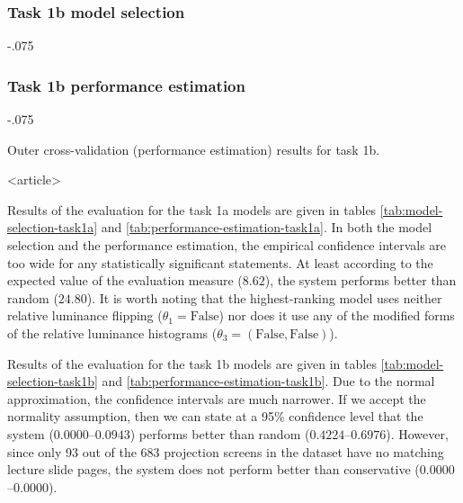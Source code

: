 \begin{frame}[fragile]
\frametitle<presentation>{Task 1b model selection}
\begin{table}
\ifarticle
  \leavevmode\kern-.075\textwidth
\fi

\caption{Inner cross-validation (model selection) results for task 1b.
\ifarticle
  Results for all 11 parametrized task 1b models are shown.%
\fi}
\label{tab:model-selection-task1b}
\end{table}
\end{frame}

\begin{frame}[fragile]
\frametitle<presentation>{Task 1b performance estimation}
\begin{table}
\ifarticle
  \leavevmode\kern-.075\textwidth
\fi

\caption{Outer cross-validation (performance estimation) results for task 1b.}
\label{tab:performance-estimation-task1b}
\end{table}
\end{frame}

\mode
<article>

Results of the evaluation for the task 1a models are given in tables
\ref{tab:model-selection-task1a} and \ref{tab:performance-estimation-task1a}.
In both the model selection and the performance estimation, the empirical
confidence intervals are too wide for any statistically significant statements.
At least according to the expected value of the evaluation measure ($8.62$),
the system performs better than random ($24.80$).
It is worth noting that the highest-ranking model uses neither relative
luminance flipping ($\theta_1=\text{False}$) nor does it use any of the
modified forms of the relative luminance histograms ($\theta_3=(\text{False},
\text{False})$).

Results of the evaluation for the task 1b models are given in tables
\ref{tab:model-selection-task1b} and \ref{tab:performance-estimation-task1b}.
Due to the normal approximation, the confidence intervals are much narrower. If
we accept the normality assumption, then we can state at a 95\% confidence
level that the system ($0.0000$--$0.0943$) performs better than random
($0.4224$--$0.6976$). However, since only 93 out of the 683 projection screens
in the dataset have no matching lecture slide pages, the system does not
perform better than conservative ($0.0000$--$0.0000$).

